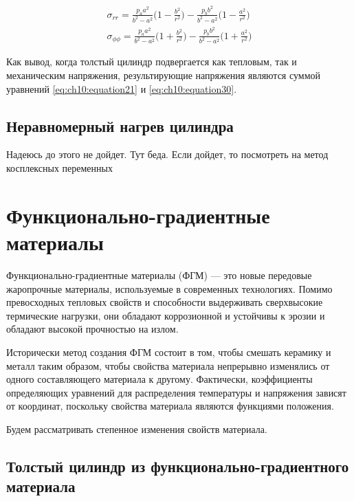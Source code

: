 \begin{equation}
	\label{eq:ch10:equation30}
	\begin{split}
		\sigma_{rr} = \frac{p_a a^2}{b^2 - a^2} \big (1-\frac{b^2}{r^2} \big )- \frac{p_b b^2}{b^2-a^2} \big (1 - \frac{a^2}{r^2} \big )\\
		\sigma_{\phi\phi} = \frac{p_a a^2}{b^2 - a^2} \big (1+\frac{b^2}{r^2} \big )- \frac{p_b b^2}{b^2-a^2} \big (1 + \frac{a^2}{r^2} \big )
	\end{split}
\end{equation}

Как вывод, когда толстый цилиндр подвергается как тепловым, так и механическим напряжения, результирующие напряжения являются суммой уравнений \cref{eq:ch10:equation21} и \cref{eq:ch10:equation30}.

\section{Неравномерный нагрев цилиндра}
\label{sec:ch10/sec2}
Надеюсь до этого не дойдет. Тут беда. 
Если дойдет, то посмотреть на метод косплексных переменных 

\chapter{Функционально-градиентные материалы}\label{ch:ch2}

Функционально-градиентные материалы (ФГМ) --- это новые передовые жаропрочные материалы, используемые в современных технологиях. Помимо превосходных тепловых свойств и способности выдерживать сверхвысокие термические нагрузки, они обладают коррозионной и
устойчивы к эрозии и обладают высокой прочностью на излом.


Исторически метод создания ФГМ состоит в том, чтобы смешать керамику и металл таким образом, чтобы свойства материала непрерывно изменялись от одного составляющего материала к другому. Фактически, коэффициенты определяющих уравнений для распределения температуры и напряжения зависят от координат, поскольку свойства материала являются функциями положения.

Будем рассматривать степенное изменения свойств материала.

\section{Толстый цилиндр из функционально-градиентного материала} \label{ch:ch2/sec1}

